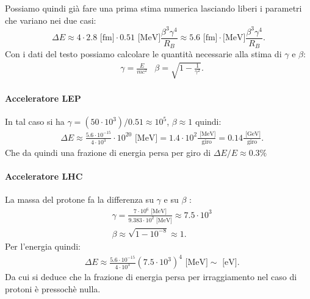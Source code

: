 Possiamo quindi già fare una prima stima numerica lasciando liberi i parametri che variano nei due casi:
\[
\Delta E \approx 4 \cdot 2.8 \text{ [fm]}\cdot 0.51 \text{ [MeV]} \frac{\beta^3\gamma^4}{R_B} \approx 5.6 \text{ [fm]} \cdot \text{[MeV]} \frac{\beta^3\gamma^4}{R_B} 
.\] 
Con i dati del testo possiamo calcolare le quantità necessarie alla stima di $\gamma$ e $\beta$:
\begin{align*}
	&\gamma = \frac{E}{mc^2}  &\beta = \sqrt{1- \frac{1}{\gamma^2}} 
.\end{align*}

\paragraph{Acceleratore LEP}%
In tal caso si ha $\gamma=(50 \cdot 10^{3}) / 0.51 \approx 10^5$, $\beta \approx 1$ quindi:
\begin{align*}
	& \Delta E \approx \frac{5.6 \cdot 10^{-15}}{4 \cdot 10^{3}} \cdot 10^{20}\text{ [MeV]}=1.4 \cdot 10^{2} \frac{\text{ [MeV]} }{\text{giro}} = 
	0.14 \frac{\text{ [GeV]} }{\text{giro}}
.\end{align*}
Che da quindi una frazione di energia persa per giro di $\Delta E / E \approx 0.3 \%$
\paragraph{Acceleratore LHC}%
La massa del protone fa la differenza su $\gamma$ e su $\beta$ :
\begin{align*}
	&\gamma = \frac{7 \cdot 10^{6} \text{ [MeV]}}{9.383 \cdot 10^{2}  \text{ [MeV]}}\approx 7.5 \cdot 10^{3} \\
	&\beta \approx \sqrt{1- 10^{-8}}\approx 1 
.\end{align*}
Per l'energia quindi:
\begin{align*}
	& \Delta E \approx \frac{5.6 \cdot 10^{-15} }{4 \cdot 10^{3} } \left( 7.5 \cdot 10^{3}  \right) ^4 \text{ [MeV]} \sim \text{ [eV]}  
.\end{align*}
Da cui si deduce che la frazione di energia persa per irraggiamento nel caso di protoni è pressochè nulla.


